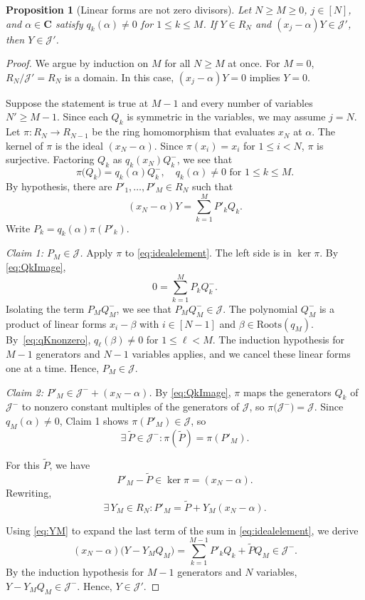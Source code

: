 \documentclass[12pt]{amsart}
\newtheorem{proposition}[theorem]{Proposition}
\theoremstyle{definition}
\theoremstyle{remark}
\newcommand{\BC}{\mathbf C}
\newcommand{\TP}{\tilde P}
\newcommand{\cJ}{\mathcal J}
\newcommand{\Roots}{\mathrm{Roots}}
\begin{document}
\begin{proposition}[Linear forms are not zero divisors]\label{prop:linform}
Let $N \geq M \geq 0$, $j \in [N]$, and $\alpha \in \BC$ satisfy
$q_k(\alpha) \neq 0$ for $1 \leq k \leq M$.
If $Y \in  R_N$ and $(x_j - \alpha) Y \in \cJ'$, then $Y \in \cJ'$.
\end{proposition}
\begin{proof}
We argue by induction on $M$ for all $N \geq M$ at once.  
For $M = 0$, $R_{N} / \cJ' = R_{N}$ is a domain.
In this case, $(x_j - \alpha) Y = 0$ implies $Y = 0$.

Suppose the statement is true at $M-1$ and every number of variables $N' \geq M-1$.
Since each $Q_k$ is symmetric in the variables, we may assume $j = N$.
Let $\pi: R_N \rightarrow R_{N-1}$ be the ring homomorphism
that evaluates $x_N$ at $\alpha$.  The kernel of $\pi$ is the ideal $(x_N - \alpha)$.
Since $\pi(x_i) = x_i$ for $1 \leq i < N$, $\pi$ is surjective.
Factoring $Q_k$ as $q_k(x_N)Q^-_k$, we see that
\begin{equation}\label{eq:QkImage}
 \pi\bigl(Q_k\bigr) = q_k(\alpha) Q^-_k, \quad q_k(\alpha) \neq 0 \text{ for } 1 \leq k \leq M.
 \end{equation}
By hypothesis, there are $P'_1, \ldots, P'_M \in R_N$ such that
\begin{equation}\label{eq:idealelement}
(x_N - \alpha) Y = \sum_{k=1}^M P'_k Q_k.
\end{equation}
Write $P_k = q_k(\alpha) \pi(P'_k)$.

\smallskip
\emph{Claim 1:  $P_M \in \cJ$.}   Apply $\pi$ to \eqref{eq:idealelement}.
The left side is in $\ker \pi$.  By \eqref{eq:QkImage},
\[
0 = \sum_{k=1}^M P_k Q^-_k.
\]
Isolating the term $P_M Q^-_M$, we see that $P_M Q^-_M \in \cJ$.
The polynomial $Q^-_M$ is a product of linear forms $x_i - \beta$ with
$i \in [N-1]$ and $\beta \in \Roots(q_M)$.
By~\eqref{eq:qKnonzero},
$q_\ell(\beta) \neq 0$ for $1 \leq \ell < M$.
The induction hypothesis for $M-1$ generators and $N-1$ variables
applies, and we cancel these linear forms one at a time.  Hence, $P_M \in \cJ$.

\smallskip
\emph{Claim 2: $P'_M \in \cJ^- + (x_N - \alpha)$.}
By \eqref{eq:QkImage}, $\pi$ maps the generators $Q_k$ of $\cJ^-$ to
nonzero constant multiples of the generators of $\cJ$, so 
$\pi\bigl(\cJ^-\bigr) = \cJ$.  Since $q_M(\alpha) \neq 0$, Claim 1 shows
$\pi(P'_M) \in \cJ$, so
\[ \exists\, \TP \in \cJ^- :  \pi(\TP) = \pi(P'_M). \]

For this $\TP$, we have
\[ P'_M - \TP \in \ker \pi = (x_N - \alpha). \]
Rewriting,
\begin{equation}\label{eq:YM}
\exists\, Y_M \in R_N : P'_M = \TP + Y_M (x_N-\alpha).
\end{equation}

\smallskip
Using \eqref{eq:YM} to expand the last term of the sum in \eqref{eq:idealelement}, we derive
\[
(x_N - \alpha) \bigl(Y - Y_M Q_M \bigr) = 
\sum_{k=1}^{M-1} P'_k Q_k +  \TP Q_M \in \cJ^-.
\]
By the induction hypothesis for $M-1$ generators and $N$ variables,
$Y - Y_M Q_M \in \cJ^-$.  Hence, $Y \in \cJ'$.
\end{proof}
\end{document}

